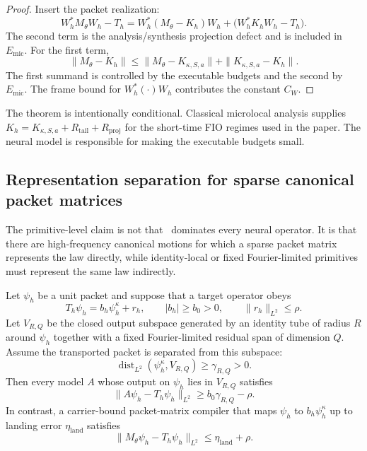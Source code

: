\begin{proof}
Insert the packet realization:
\[
W_h^\ast M_\theta W_h-T_h
=W_h^\ast(M_\theta-K_h)W_h
  +\bigl(W_h^\ast K_h W_h-T_h\bigr).
\]
The second term is the analysis/synthesis projection defect and is included in
$E_{\mathrm{mic}}$.  For the first term,
\[
\|M_\theta-K_h\|
\le
\|M_\theta-K_{\kappa,S,a}\|
+\|K_{\kappa,S,a}-K_h\|.
\]
The first summand is controlled by the executable budgets and the second by
$E_{\mathrm{mic}}$.  The frame bound for $W_h^\ast(\cdot)W_h$ contributes the
constant $C_W$.
\end{proof}

The theorem is intentionally conditional.  Classical microlocal analysis
supplies $K_h=K_{\kappa,S,a}+R_{\mathrm{tail}}+R_{\mathrm{proj}}$ for the
short-time FIO regimes used in the paper.  The neural model is responsible for
making the executable budgets small.

\subsection{Representation separation for sparse canonical packet matrices}

The primitive-level claim is not that \MiNO\ dominates every neural operator.
It is that there are high-frequency canonical motions for which a sparse
packet matrix represents the law directly, while identity-local or fixed
Fourier-limited primitives must represent the same law indirectly.

\begin{theorem}
\label{thm:packet-matrix-separation}
Let $\psi_h$ be a unit packet and suppose that a target operator obeys
\[
  T_h\psi_h = b_h \psi_h^\kappa + r_h,\qquad
  |b_h|\ge b_0>0,\qquad \|r_h\|_{L^2}\le \rho .
\]
Let $V_{R,Q}$ be the closed output subspace generated by an identity tube of
radius $R$ around $\psi_h$ together with a fixed Fourier-limited residual span
of dimension $Q$.  Assume the transported packet is separated from this
subspace:
\[
  \operatorname{dist}_{L^2}(\psi_h^\kappa,V_{R,Q})\ge \gamma_{R,Q}>0 .
\]
Then every model $A$ whose output on $\psi_h$ lies in $V_{R,Q}$ satisfies
\[
  \|A\psi_h-T_h\psi_h\|_{L^2}
  \ge b_0\gamma_{R,Q}-\rho .
\]
In contrast, a carrier-bound packet-matrix compiler that maps $\psi_h$ to
$b_h\psi_h^\kappa$ up to landing error $\eta_{\mathrm{land}}$ satisfies
\[
  \|M_\theta\psi_h-T_h\psi_h\|_{L^2}
  \le \eta_{\mathrm{land}}+\rho .
\]
\end{theorem}

